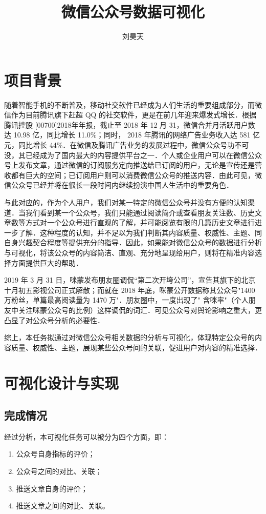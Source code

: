 \documentclass[a4paper,12pt]{article}
\title{微信公众号数据可视化}
\author{刘昊天}
\begin{document}
    \maketitle
    \section{项目背景}
    随着智能手机的不断普及，移动社交软件已经成为人们生活的重要组成部分，而微信作为目前腾讯旗下赶超 QQ 的社交软件，更是在前几年迎来爆发式增长．根据腾讯控股 [00700]2018年年报，截止至 2018 年 12 月 31，微信合并月活跃用户数达 10.98 亿，同比增长 11.0\%；同时， 2018 年腾讯的网络广告业务收入达 581 亿元，同比增长 44\%．在微信及腾讯广告业务的发展过程中，微信公众号功不可没，其已经成为了国内最大的内容提供平台之一．个人或企业用户可以在微信公众号上发布文章，通过微信的订阅服务定向推送给已订阅的用户，无论是宣传还是营收都有巨大的空间；已订阅用户则可以消费微信公众号的推送内容．由此可见，微信公众号已经并将在很长一段时间内继续扮演中国人生活中的重要角色．

    与此对应的，作为个人用户，我们对某一特定的微信公众号并没有方便的认知渠道．当我们看到某一个公众号，我们只能通过阅读简介或查看朋友关注数、历史文章数等方式对一个公众号进行直观的了解，并可能阅览有限的几篇历史文章进行进一步了解．这种程度的认知，并不足以为我们判断其内容质量、权威性、主题、同自身兴趣契合程度等提供充分的指导．因此，如果能对微信公众号的数据进行分析与可视化，将该公众号的内容简洁、直观、充分地呈现给用户，则将在精准内容选择方面提供巨大的帮助．

    2019 年 3 月 31 日，咪蒙发布朋友圈调侃“第二次开垮公司”，宣告其旗下的北京〸月初五影视公司正式解散；而就在 2018 年底，咪蒙公开数据称其公众号"1400 万粉丝，单篇最高阅读量为 1470 万"．朋友圈中，一度出现了" 含咪率"（个人朋友中关注咪蒙公众号的比例）这样调侃的词汇．可见公众号对舆论影响之重大，更凸显了对公众号分析的必要性．

    综上，本任务拟通过对微信公众号相关数据的分析与可视化，体现特定公众号的内容质量、权威性、主题，展现某些公众号间的关联，促进用户对内容的精准选择．
    \section{可视化设计与实现}
    \subsection{完成情况}
    经过分析，本可视化任务可以被分为四个方面，即：
    \begin{enumerate}
      \item 公众号自身指标的评价；
      \item 公众号之间的对比、关联；
      \item 推送文章自身的评价；
      \item 推送文章之间的对比、关联。
    \end{enumerate}
\end{document}
